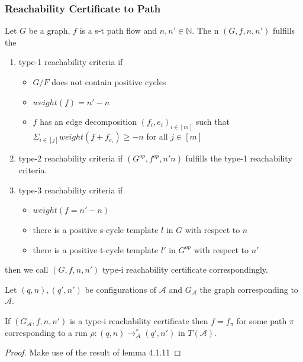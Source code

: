 \documentclass{beamer}
\begin{document}
\begin{frame}
\frametitle{Reachability Certificate to Path}
\begin{definition}
Let $G$ be a graph, $f$ is a s-t path flow and $n,n' \in \mathbb{N}$. The
n $(G,f,n,n')$ fulfills the 

\begin{enumerate}
\item type-1 reachability criteria if
\begin{itemize}
\item $G/F$ does not contain positive cycles
\item $weight(f) = n'-n$
\item $f$ has an edge decomposition $(f_i, e_i)_{i\in [m]}$ such that $\Sigma_{i\in[j]} weight(f+f_{e_i}) \ge -n$ for all $j \in [m]$


\end{itemize}

\item type-2 reachability criteria if $(G^{op},f^{op}, n' n)$ fulfills the type-1 reachability criteria.

\item type-3 reachability criteria if \begin{itemize}
\item $weight(f = n'- n)$

\item there is a positive s-cycle template $l$ in $G$ with respect  to $n$

\item there is a positive t-cycle template $l'$ in $G^{op}$ with respect to $n'$ 
\end{itemize}
\end{enumerate}then we call $(G, f, n, n')$ type-i reachability certificate correspondingly.
\end{definition}
\end{frame}


\begin{frame}
\begin{lemma}[4.1.12]
Let $(q, n), (q', n')$ be configurations of $\mathcal{A}$ and $G_{\mathcal{A}}$ the graph corresponding to $\mathcal{A}$. 

If $(G_\mathcal{A}, f, n, n')$ is a type-i reachability certificate then $f = f_\pi$ for some path $\pi$ corresponding to a run $\rho:(q, n)\rightarrow^*_\mathcal{A} (q', n')$ in $T(\mathcal{A})$.

\end{lemma}
\begin{proof}
Make use of the result of lemma 4.1.11
\end{proof}
\end{frame}
\end{document}
